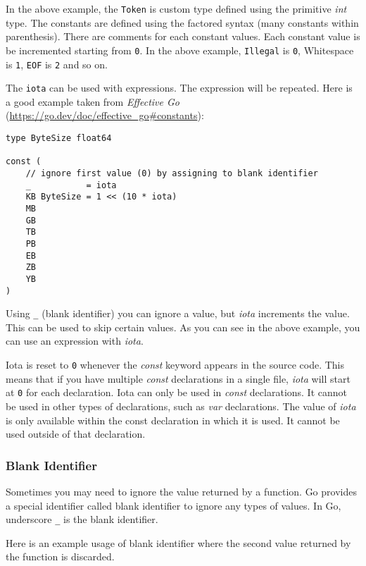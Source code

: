 In the above example, the \texttt{Token} is custom type defined using
the primitive \textit{int} type.  The constants are defined using the
factored syntax (many constants within parenthesis).  There are
comments for each constant values.  Each constant value is be
incremented starting from \texttt{0}.  In the above
example, \texttt{Illegal} is \texttt{0}, Whitespace
is \texttt{1}, \texttt{EOF} is \texttt{2} and so on.

The \texttt{iota} can be used with expressions.  The expression will
be repeated.  Here is a good example taken from \textit{Effective
Go} (\url{https://go.dev/doc/effective_go#constants}):

\begin{lstlisting}[numbers=none]
type ByteSize float64

const (
    // ignore first value (0) by assigning to blank identifier
    _           = iota
    KB ByteSize = 1 << (10 * iota)
    MB
    GB
    TB
    PB
    EB
    ZB
    YB
)
\end{lstlisting}

Using \texttt{\_} (blank identifier) you can ignore a value,
but \textit{iota} increments the value.  This can be used to skip
certain values.  As you can see in the above example, you can use an
expression with \textit{iota}.

Iota is reset to \texttt{0} whenever the \textit{const} keyword appears in the
source code. This means that if you have multiple \textit{const} declarations in
a single file, \textit{iota} will start at \texttt{0} for each declaration. Iota
can only be used in \textit{const} declarations. It cannot be used in other
types of declarations, such as \textit{var} declarations. The value
of \textit{iota} is only available within the const declaration in which it is
used. It cannot be used outside of that declaration.

\subsubsection{Blank Identifier}

Sometimes you may need to ignore the value returned by a function.  Go
provides a special identifier called blank identifier\index{\_} to ignore any types of values. In Go,
underscore \texttt{\_} is the blank identifier.

Here is an example usage of blank identifier where the second value
returned by the function is discarded.

